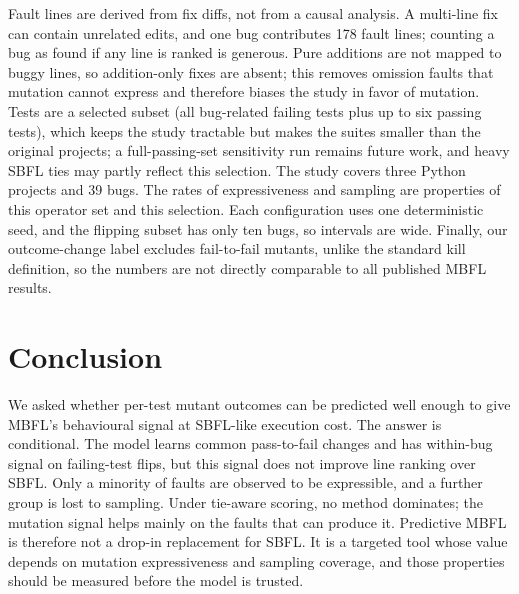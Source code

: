 \documentclass[10pt,conference]{IEEEtran}
\begin{document}
Fault lines are derived from fix diffs, not from a causal analysis. A multi-line fix can contain unrelated edits, and one bug contributes 178 fault lines; counting a bug as found if any line is ranked is generous. Pure additions are not mapped to buggy lines, so addition-only fixes are absent; this removes omission faults that mutation cannot express and therefore biases the study in favor of mutation. Tests are a selected subset (all bug-related failing tests plus up to six passing tests), which keeps the study tractable but makes the suites smaller than the original projects; a full-passing-set sensitivity run remains future work, and heavy SBFL ties may partly reflect this selection. The study covers three Python projects and 39 bugs. The rates of expressiveness and sampling are properties of this operator set and this selection. Each configuration uses one deterministic seed, and the flipping subset has only ten bugs, so intervals are wide. Finally, our outcome-change label excludes fail-to-fail mutants, unlike the standard kill definition, so the numbers are not directly comparable to all published MBFL results.

\section{Conclusion}

We asked whether per-test mutant outcomes can be predicted well enough to give MBFL's behavioural signal at SBFL-like execution cost. The answer is conditional. The model learns common pass-to-fail changes and has within-bug signal on failing-test flips, but this signal does not improve line ranking over SBFL. Only a minority of faults are observed to be expressible, and a further group is lost to sampling. Under tie-aware scoring, no method dominates; the mutation signal helps mainly on the faults that can produce it. Predictive MBFL is therefore not a drop-in replacement for SBFL. It is a targeted tool whose value depends on mutation expressiveness and sampling coverage, and those properties should be measured before the model is trusted.
\end{document}
